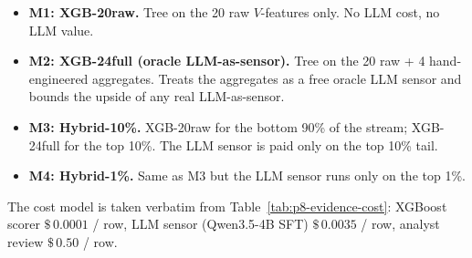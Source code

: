 \documentclass{article}
\providecommand{\tableref}[1]{Table~\ref{#1}}
\begin{document}
\begin{itemize}
\item \textbf{M1: XGB-20raw.} Tree on the 20 raw $V$-features only.
  No LLM cost, no LLM value.
\item \textbf{M2: XGB-24full (oracle LLM-as-sensor).} Tree on the 20
  raw + 4 hand-engineered aggregates. Treats the aggregates as a free
  oracle LLM sensor and bounds the upside of any real LLM-as-sensor.
\item \textbf{M3: Hybrid-10\%.} XGB-20raw for the bottom 90\% of the
  stream; XGB-24full for the top 10\%. The LLM sensor is paid only
  on the top 10\% tail.
\item \textbf{M4: Hybrid-1\%.} Same as M3 but the LLM sensor runs
  only on the top 1\%.
\end{itemize}

The cost model is taken verbatim from
\tableref{tab:p8-evidence-cost}: XGBoost scorer
$\$\,0.0001$ / row, LLM sensor (Qwen3.5-4B SFT) $\$\,0.0035$ / row,
analyst review $\$\,0.50$ / row.
\end{document}
